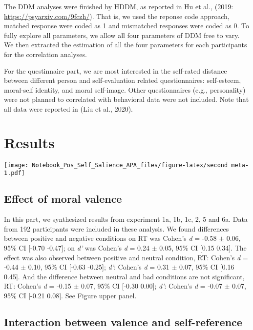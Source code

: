 \documentclass[
  man]{apa6}
\begin{document}
The DDM analyses were finished by HDDM, as reported in Hu et al., (2019: \url{https://psyarxiv.com/9fczh/}). That is, we used the reponse code approach, matched response were coded as 1 and mismatched responses were coded as 0. To fully explore all parameters, we allow all four parameters of DDM free to vary. We then extracted the estimation of all the four parameters for each participants for the correlation analyses.

For the questinnaire part, we are most interested in the self-rated distance between different person and self-evaluation related questionnaires: self-esteem, moral-self identity, and moral self-image. Other questionnaires (e.g., personality) were not planned to correlated with behavioral data were not included. Note that all data were reported in (Liu et al., 2020).

\hypertarget{results}{%
\section{Results}\label{results}}

\texttt{[image: Notebook\_Pos\_Self\_Salience\_APA\_files/figure-latex/second meta-1.pdf]}

\hypertarget{effect-of-moral-valence}{%
\subsection{Effect of moral valence}\label{effect-of-moral-valence}}

In this part, we synthesized results from experiment 1a, 1b, 1c, 2, 5 and 6a. Data from 192 participants were included in these analysis. We found differences between positive and negative conditions on RT was Cohen's \emph{d} = -0.58 \(\pm\) 0.06, 95\% CI {[}-0.70 -0.47{]}; on \emph{d'} was Cohen's \emph{d} = 0.24 \(\pm\) 0.05, 95\% CI {[}0.15 0.34{]}. The effect was also observed between positive and neutral condition, RT: Cohen's \emph{d} = -0.44 \(\pm\) 0.10, 95\% CI {[}-0.63 -0.25{]}; \emph{d'}: Cohen's \emph{d} = 0.31 \(\pm\) 0.07, 95\% CI {[}0.16 0.45{]}. And the difference between neutral and bad conditions are not significant, RT: Cohen's \emph{d} = -0.15 \(\pm\) 0.07, 95\% CI {[}-0.30 0.00{]}; \emph{d'}: Cohen's \emph{d} = -0.07 \(\pm\) 0.07, 95\% CI {[}-0.21 0.08{]}. See Figure upper panel.

\hypertarget{interaction-between-valence-and-self-reference}{%
\subsection{Interaction between valence and self-reference}\label{interaction-between-valence-and-self-reference}}
\end{document}
